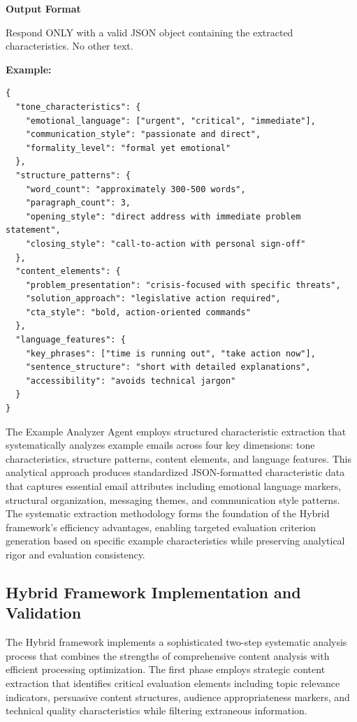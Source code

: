 \begin{promptbox}[title={Example Analyzer Agent Prompt Template (2/2)}]

\textbf{Output Format}

Respond ONLY with a valid JSON object containing the extracted characteristics. No other text.

\textbf{Example:}
\begin{verbatim}
{
  "tone_characteristics": {
    "emotional_language": ["urgent", "critical", "immediate"],
    "communication_style": "passionate and direct",
    "formality_level": "formal yet emotional"
  },
  "structure_patterns": {
    "word_count": "approximately 300-500 words",
    "paragraph_count": 3,
    "opening_style": "direct address with immediate problem statement",
    "closing_style": "call-to-action with personal sign-off"
  },
  "content_elements": {
    "problem_presentation": "crisis-focused with specific threats",
    "solution_approach": "legislative action required",
    "cta_style": "bold, action-oriented commands"
  },
  "language_features": {
    "key_phrases": ["time is running out", "take action now"],
    "sentence_structure": "short with detailed explanations",
    "accessibility": "avoids technical jargon"
  }
}
\end{verbatim}
\end{promptbox}

The Example Analyzer Agent employs structured characteristic extraction that systematically analyzes example emails across four key dimensions: tone characteristics, structure patterns, content elements, and language features. This analytical approach produces standardized JSON-formatted characteristic data that captures essential email attributes including emotional language markers, structural organization, messaging themes, and communication style patterns. The systematic extraction methodology forms the foundation of the Hybrid framework's efficiency advantages, enabling targeted evaluation criterion generation based on specific example characteristics while preserving analytical rigor and evaluation consistency.

\subsection{Hybrid Framework Implementation and Validation}

The Hybrid framework implements a sophisticated two-step systematic analysis process that combines the strengths of comprehensive content analysis with efficient processing optimization. The first phase employs strategic content extraction that identifies critical evaluation elements including topic relevance indicators, persuasive content structures, audience appropriateness markers, and technical quality characteristics while filtering extraneous information.


